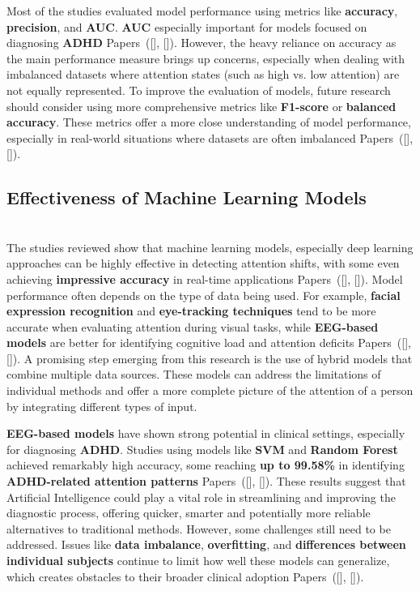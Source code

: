 \documentclass[12pt]{article}
\newcommand{\pct}{\%}
\begin{document}
Most of the studies evaluated model performance using metrics like \textbf{accuracy}, \textbf{precision}, and \textbf{AUC}. \textbf{AUC} especially important for models focused on diagnosing \textbf{ADHD} Papers~([\citealp{ref11}], [\citealp{ref19}]). However, the heavy reliance on accuracy as the main performance measure brings up concerns, especially when dealing with imbalanced datasets where attention states (such as high vs. low attention) are not equally represented. To improve the evaluation of models, future research should consider using more comprehensive metrics like \textbf{F1-score} or \textbf{balanced accuracy}. These metrics offer a more close understanding of model performance, especially in real-world situations where datasets are often imbalanced Papers~([\citealp{ref9}], [\citealp{ref13}]).

\subsection{ Effectiveness of Machine Learning Models} \\

The studies reviewed show that machine learning models, especially deep learning approaches can be highly effective in detecting attention shifts, with some even achieving \textbf{impressive accuracy} in real-time applications Papers~([\citealp{ref1}], [\citealp{ref8}]). Model performance often depends on the type of data being used. For example, \textbf{facial expression recognition} and \textbf{eye-tracking techniques} tend to be more accurate when evaluating attention during visual tasks, while \textbf{EEG-based models} are better for identifying cognitive load and attention deficits Papers~([\citealp{ref3}], [\citealp{ref16}]). A promising step emerging from this research is the use of hybrid models that combine multiple data sources. These models can address the limitations of individual methods and offer a more complete picture of the attention of a person by integrating different types of input.

\textbf{EEG-based models} have shown strong potential in clinical settings, especially for diagnosing \textbf{ADHD}. Studies using models like \textbf{SVM} and \textbf{Random Forest} achieved remarkably high accuracy, some reaching \textbf{up to 99.58\pct} in identifying \textbf{ADHD-related attention patterns} Papers~([\citealp{ref11}], [\citealp{ref19}]). These results suggest that Artificial Intelligence could play a vital role in streamlining and improving the diagnostic process, offering quicker, smarter and potentially more reliable alternatives to traditional methods. However, some challenges still need to be addressed. Issues like \textbf{data imbalance}, \textbf{overfitting}, and \textbf{differences between individual subjects} continue to limit how well these models can generalize, which creates obstacles to their broader clinical adoption Papers~([\citealp{ref3}], [\citealp{ref13}]).
\end{document}

